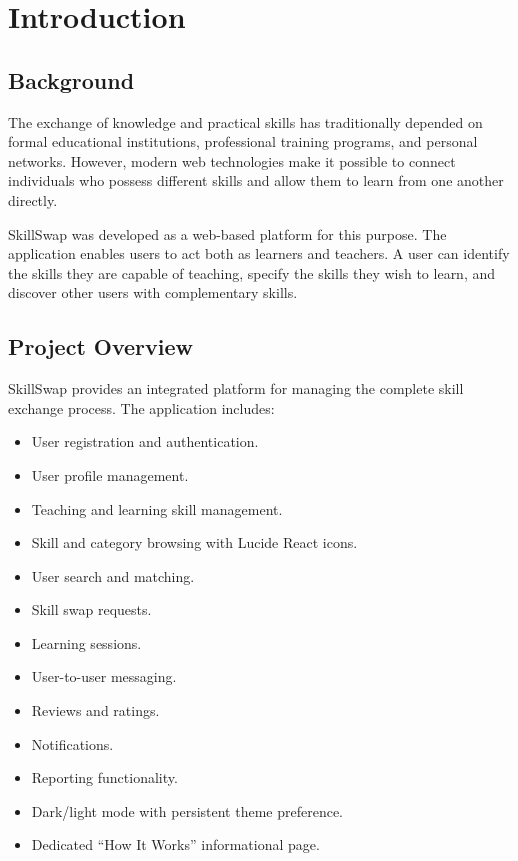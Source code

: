 \documentclass[12pt,a4paper]{report}
\begin{document}
\chapter{Introduction}

\section{Background}
The exchange of knowledge and practical skills has traditionally depended on
formal educational institutions, professional training programs, and personal
networks.  However, modern web technologies make it possible to connect
individuals who possess different skills and allow them to learn from one another
directly.

SkillSwap was developed as a web-based platform for this purpose.  The
application enables users to act both as learners and teachers.  A user can
identify the skills they are capable of teaching, specify the skills they wish to
learn, and discover other users with complementary skills.

\section{Project Overview}
SkillSwap provides an integrated platform for managing the complete skill
exchange process.  The application includes:

\begin{itemize}[noitemsep]
  \item User registration and authentication.
  \item User profile management.
  \item Teaching and learning skill management.
  \item Skill and category browsing with Lucide React icons.
  \item User search and matching.
  \item Skill swap requests.
  \item Learning sessions.
  \item User-to-user messaging.
  \item Reviews and ratings.
  \item Notifications.
  \item Reporting functionality.
  \item Dark/light mode with persistent theme preference.
  \item Dedicated ``How It Works'' informational page.
\end{itemize}
\end{document}
